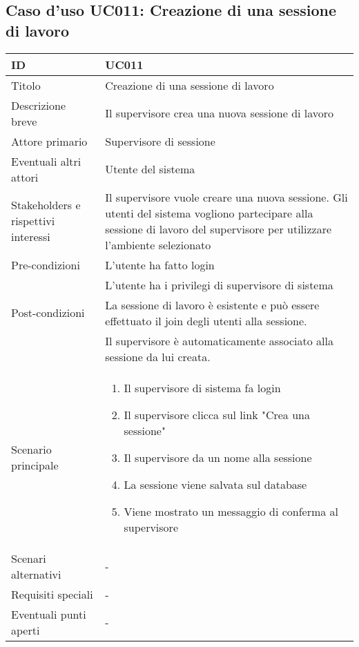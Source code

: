 \documentclass[../../main.tex]{subfiles}
\begin{document}
\subsection{Caso d’uso UC011: Creazione di una sessione di lavoro }
\begin{tabularx}{150mm}{|l|X|}
    \hline
    ID                                  & \textbf{UC011} \\
    \hline
    Titolo                              & Creazione di una sessione di lavoro \\
    \hline
    Descrizione breve                   & Il supervisore crea una nuova sessione di lavoro   \\
    \hline
    Attore primario                     & Supervisore di sessione   \\
    \hline
    Eventuali altri attori              & Utente del sistema   \\
    \hline
    Stakeholders e rispettivi interessi & Il supervisore vuole creare una nuova sessione. Gli utenti del sistema vogliono partecipare alla sessione di lavoro del supervisore per utilizzare l'ambiente selezionato \\
    \hline
    Pre-condizioni                      & L'utente ha fatto login \\ & L'utente ha i privilegi di supervisore di sistema   \\
    \hline
    Post-condizioni                     & La sessione di lavoro è esistente e può essere effettuato il join degli utenti alla sessione.  
    \\ & Il supervisore è automaticamente associato alla sessione da lui creata. \\
    \hline
    Scenario principale                 &
    \begin {enumerate}
\item Il supervisore di sistema fa login
\item Il supervisore clicca sul link "Crea una sessione"
\item Il supervisore da un nome alla sessione
\item La sessione viene salvata sul database
\item Viene mostrato un messaggio di conferma al supervisore
    \end {enumerate}
\\
    \hline
    Scenari alternativi                 & -   \\
    \hline
    Requisiti speciali                  & -   \\
    \hline
    Eventuali punti aperti              & -   \\
    \hline
\end{tabularx}
\vfill\newpage
\end{document}
